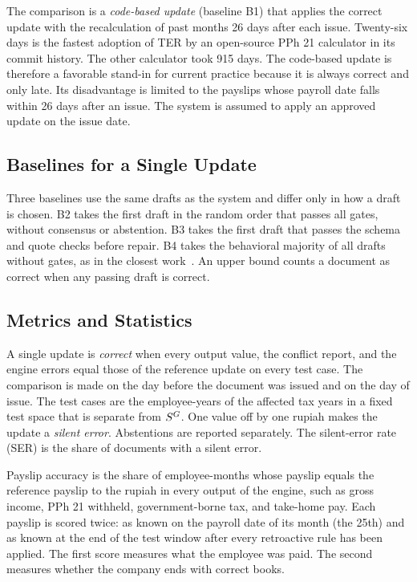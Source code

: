 The comparison is a \emph{code-based update} (baseline B1) that applies the correct update with the recalculation of past months 26 days after each issue. Twenty-six days is the fastest adoption of TER by an open-source PPh 21 calculator in its commit history. The other calculator took 915 days. The code-based update is therefore a favorable stand-in for current practice because it is always correct and only late. Its disadvantage is limited to the payslips whose payroll date falls within 26 days after an issue. The system is assumed to apply an approved update on the issue date.

\subsection{Baselines for a Single Update}
Three baselines use the same drafts as the system and differ only in how a draft is chosen. B2 takes the first draft in the random order that passes all gates, without consensus or abstention. B3 takes the first draft that passes the schema and quote checks before repair. B4 takes the behavioral majority of all drafts without gates, as in the closest work~\cite{goganikhiabani2025maintaining}. An upper bound counts a document as correct when any passing draft is correct.

\subsection{Metrics and Statistics}
\label{sec:metrics}
A single update is \emph{correct} when every output value, the conflict report, and the engine errors equal those of the reference update on every test case. The comparison is made on the day before the document was issued and on the day of issue. The test cases are the employee-years of the affected tax years in a fixed test space that is separate from $S^{G}$. One value off by one rupiah makes the update a \emph{silent error}. Abstentions are reported separately. The silent-error rate (SER) is the share of documents with a silent error.

Payslip accuracy is the share of employee-months whose payslip equals the reference payslip to the rupiah in every output of the engine, such as gross income, PPh 21 withheld, government-borne tax, and take-home pay. Each payslip is scored twice: as known on the payroll date of its month (the 25th) and as known at the end of the test window after every retroactive rule has been applied. The first score measures what the employee was paid. The second measures whether the company ends with correct books.

